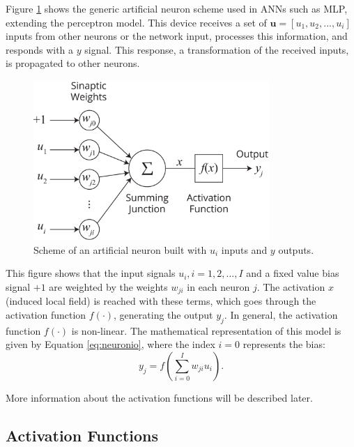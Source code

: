 \documentclass[ruled,graybox]{svmult}
\begin{document}
Figure \ref{fig:neuronio} shows the generic artificial neuron scheme used in ANNs such as MLP, extending the perceptron model. This device receives a set of $\textbf{u} = [ u_1 , u_2 ,..., u_i]$ inputs from other neurons or the network input, processes this information, and responds with a $y$ signal. This response, a transformation of the received inputs, is propagated to other neurons.

\begin{figure}[h!]
	\caption{Scheme of an artificial neuron built with $u_i$ inputs and $y$ outputs.}
	\vspace{0.2cm}
	\begin{center}
		\includegraphics[width=0.8\textwidth]{neuronioArtificial.png}
	\end{center}
	\label{fig:neuronio}
\end{figure}

This figure shows that the input signals $u_i , i=1, 2,..., I$ and a fixed value bias signal $+1$ are weighted by the weights $w_{ji}$ in each neuron $j$. The activation $x$ (induced local field) is reached with these terms, which goes through the activation function $f(\cdot)$, generating the output $y_j$. In general, the activation function $f(\cdot)$ is non-linear. The mathematical representation of this model is given by Equation \ref{eq:neuronio}, %
where
the index $i=0$ represents the bias:
\begin{equation}
    \label{eq:neuronio}
    y_j = f \left( \sum_{i=0}^I w_{ji} u_i  \right).
\end{equation}

More information about the activation functions will be described
later.

\subsection{Activation Functions}
\label{ssec:ativacao}
\end{document}

